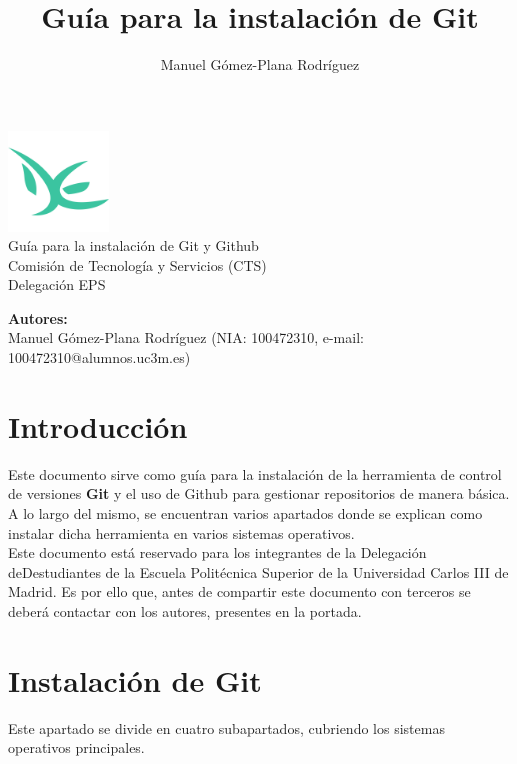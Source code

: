 \documentclass[]{article}
\title{Guía para la instalación de Git}
\author{Manuel Gómez-Plana Rodríguez}
\begin{document}
\begin{titlepage}
    \centering
    {
        \includegraphics[width=0.2\textwidth]{./static/eps_logo.png}\\
        \huge Guía para la instalación de Git y Github\\
        \vspace{0.5cm}
        \Large Comisión de Tecnología y Servicios (CTS)\\
        \Large Delegación EPS\\
        \vspace{12.5cm}
    }

    \textbf{Autores:}\\
    \vspace{0.2cm}
    Manuel Gómez-Plana Rodríguez (NIA: 100472310, e-mail: 100472310@alumnos.uc3m.es)\\
    \vspace{0.5cm}
\end{titlepage}
\newpage

\renewcommand{\contentsname}{\centering Índice}
\tableofcontents
\listoffigures

\newpage
\section{Introducción}
Este documento sirve como guía para la instalación de la herramienta de control de versiones \textbf{Git} y el uso de Github para gestionar repositorios de manera básica. A lo largo del mismo, se encuentran varios apartados donde se explican como instalar dicha herramienta en varios sistemas operativos.\\

Este documento está reservado para los integrantes de la Delegación deDestudiantes de la Escuela Politécnica Superior de la Universidad Carlos III de Madrid. Es por ello que, antes de compartir este documento con terceros se deberá contactar con los autores, presentes en la portada.

\newpage
\section{Instalación de Git}
Este apartado se divide en cuatro subapartados, cubriendo los sistemas operativos principales. 
\end{document}
